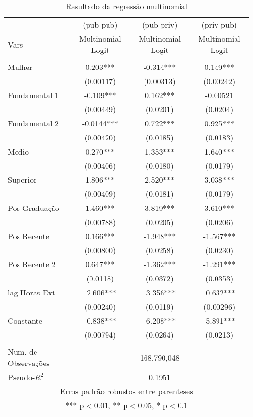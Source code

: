 \documentclass[a4paper]{article}
\begin{document}
\begin{table}[H]
\centering
\caption{Resultado da regressão multinomial}
\label{tab4}
\begin{tabular}{lccc} \hline
 & (pub-pub) & (pub-priv) & (priv-pub) \\
Vars & Multinomial Logit & Multinomial Logit & Multinomial Logit \\ \hline
 &  &  &   \\
Mulher & 0.203*** & -0.314*** &  0.149*** \\
 & (0.00117) & (0.00313) &  (0.00242) \\
Fundamental 1 & -0.109*** & 0.162***  & -0.00521 \\
 & (0.00449) & (0.0201) &  (0.0204) \\
Fundamental 2 & -0.0144*** & 0.722***  & 0.925*** \\
 & (0.00420) & (0.0185) &  (0.0183) \\
Medio & 0.270*** & 1.353*** &  1.640*** \\
 & (0.00406) & (0.0180) &  (0.0179) \\
Superior & 1.806*** & 2.520*** & 3.038*** \\
 & (0.00409) & (0.0181) &  (0.0179) \\
Pos Graduação & 1.460*** & 3.819*** &  3.610*** \\
 & (0.00788) & (0.0205) &  (0.0206) \\
Pos Recente & 0.166*** & -1.948*** &  -1.567*** \\
 & (0.00800) & (0.0258) &  (0.0230) \\
Pos Recente 2 & 0.647*** & -1.362*** &  -1.291*** \\
 & (0.0118) & (0.0372) &  (0.0353) \\
lag Horas Ext & -2.606*** & -3.356*** &  -0.632*** \\
 & (0.00240) & (0.0119) &  (0.00296) \\
Constante & -0.838*** & -6.208*** &  -5.891*** \\
 & (0.00794) & (0.0264) &  (0.0213) \\
 &  &  &   \\
 Num. de Observações & \multicolumn{3}{c}{168,790,048} \\ 
 Pseudo-$R^2$ & \multicolumn{3}{c}{0.1951}\\ \hline
\multicolumn{4}{c}{ Erros padrão robustos entre parenteses} \\
\multicolumn{4}{c}{ *** p$<$0.01, ** p$<$0.05, * p$<$0.1} \\
\end{tabular}
\end{table}
\end{document}
